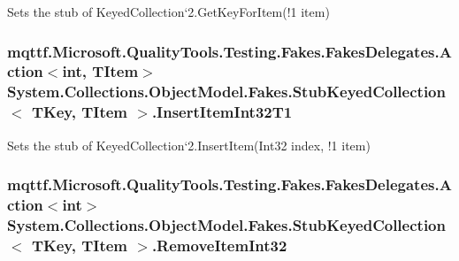 Sets the stub of Keyed\-Collection`2.Get\-Key\-For\-Item(!1 item)

\hypertarget{class_system_1_1_collections_1_1_object_model_1_1_fakes_1_1_stub_keyed_collection_3_01_t_key_00_01_t_item_01_4_ac6b9887df2564114f69ccb6980b7f50f}{
\subsubsection[{Insert\-Item\-Int32\-T1}]{\setlength{\rightskip}{0pt plus 5cm}mqttf.\-Microsoft.\-Quality\-Tools.\-Testing.\-Fakes.\-Fakes\-Delegates.\-Action$<$int, T\-Item$>$ System.\-Collections.\-Object\-Model.\-Fakes.\-Stub\-Keyed\-Collection$<$ T\-Key, T\-Item $>$.Insert\-Item\-Int32\-T1}}\label{class_system_1_1_collections_1_1_object_model_1_1_fakes_1_1_stub_keyed_collection_3_01_t_key_00_01_t_item_01_4_ac6b9887df2564114f69ccb6980b7f50f}


Sets the stub of Keyed\-Collection`2.Insert\-Item(Int32 index, !1 item)

\hypertarget{class_system_1_1_collections_1_1_object_model_1_1_fakes_1_1_stub_keyed_collection_3_01_t_key_00_01_t_item_01_4_aa173f6830720e245e3e112b54f5afc36}{
\subsubsection[{Remove\-Item\-Int32}]{\setlength{\rightskip}{0pt plus 5cm}mqttf.\-Microsoft.\-Quality\-Tools.\-Testing.\-Fakes.\-Fakes\-Delegates.\-Action$<$int$>$ System.\-Collections.\-Object\-Model.\-Fakes.\-Stub\-Keyed\-Collection$<$ T\-Key, T\-Item $>$.Remove\-Item\-Int32}}\label{class_system_1_1_collections_1_1_object_model_1_1_fakes_1_1_stub_keyed_collection_3_01_t_key_00_01_t_item_01_4_aa173f6830720e245e3e112b54f5afc36}


